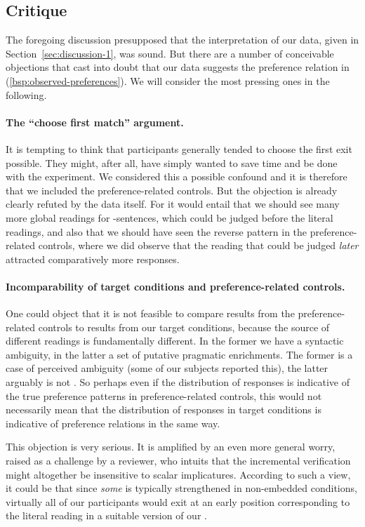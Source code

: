 \documentclass[fleqn,reqno,10pt]{article}
\renewcommand{\es}{\acro{es}}
\newcommand{\ivt}{\acro{ivt}}
\begin{document}
\subsection{Critique}

The foregoing discussion presupposed that the interpretation of our
data, given in Section~\ref{sec:discussion-1}, was sound. But there
are a number of conceivable objections that cast into doubt that our
data suggests the preference relation in
(\ref{bsp:observed-preferences}). We will consider the most pressing
ones in the following.

\paragraph{The ``choose first match'' argument.} It is tempting to
think that participants generally tended to choose the first exit
possible. They might, after all, have simply wanted to save time and
be done with the experiment. We considered this a possible confound
and it is therefore that we included the preference-related
controls. But the objection is already clearly refuted by the data
itself. For it would entail that we should see many more global
readings for \es-sentences, which could be judged before the literal
readings, and also that we should have seen the reverse pattern in the
preference-related controls, where we did observe that the reading
that could be judged \emph{later} attracted comparatively more
responses. 

\paragraph{Incomparability of target conditions and preference-related
  controls.} One could object that it is not feasible to compare
results from the preference-related controls to results from our
target conditions, because the source of different readings is
fundamentally different. In the former we have a syntactic ambiguity,
in the latter a set of putative pragmatic enrichments. The former is a
case of perceived ambiguity (some of our subjects reported this), the
latter arguably is not
\citep[see][]{GeurtsPouscoulous2009:Embedded-Implic}. So perhaps even
if the distribution of responses is indicative of the true preference
patterns in preference-related controls, this would not necessarily
mean that the distribution of responses in target conditions is
indicative of preference relations in the same way.

This objection is very serious. It is amplified by an even more
general worry, raised as a challenge by a reviewer, who intuits that
the incremental verification might altogether be insensitive to scalar
implicatures. According to such a view, it could be that since
\emph{some} is typically strengthened in non-embedded conditions,
virtually all of our participants would exit at an early position
corresponding to the literal reading in a suitable version of our
\ivt.
\end{document}
